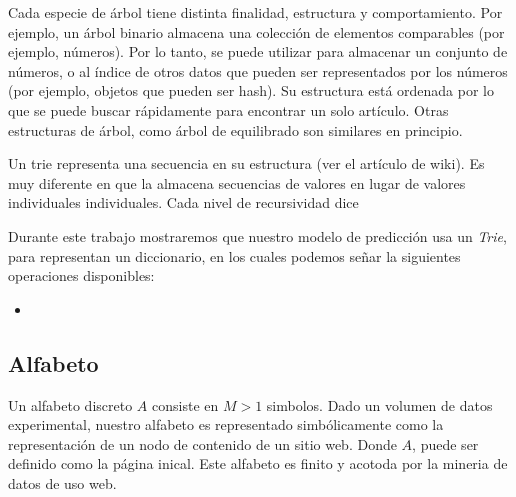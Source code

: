 Cada especie de árbol tiene distinta finalidad, estructura y comportamiento. Por ejemplo, un árbol binario almacena una colección de elementos comparables (por ejemplo, números). Por lo tanto, se puede utilizar para almacenar un conjunto de números, o al índice de otros datos que pueden ser representados por los números (por ejemplo, objetos que pueden ser hash). Su estructura está ordenada por lo que se puede buscar rápidamente para encontrar un solo artículo. Otras estructuras de árbol, como árbol de equilibrado son similares en principio.

Un trie representa una secuencia en su estructura (ver el artículo de wiki). Es muy diferente en que la almacena secuencias de valores en lugar de valores individuales individuales. Cada nivel de recursividad dice 


Durante este trabajo mostraremos que nuestro modelo de predicción usa un \emph{Trie}, para representan un diccionario, en los cuales podemos señar la siguientes operaciones disponibles:

	\begin{itemize}
	\item 

	\end{itemize}







\subsection{Alfabeto}

Un alfabeto discreto $A$ consiste en $M > 1$ simbolos.
Dado un volumen de datos experimental, nuestro alfabeto es representado simbólicamente como la representación de un nodo de contenido de un sitio web.
Donde $A$, puede ser definido como la página inical. Este alfabeto es finito y acotoda por la mineria de datos de uso web.

